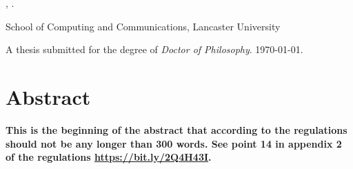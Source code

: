 \begin{center}
\textbf{\thesistitle}

\authorname, \authordegrees.

School of Computing and Communications, Lancaster University

A thesis submitted for the degree of \textit{Doctor of Philosophy}. \monthyeardate\today.
\end{center}

\section*{\centering Abstract}

\textbf{This is the beginning of the abstract that according to the regulations should not be any longer than 300 words. See point 14 in appendix 2 of the regulations \url{https://bit.ly/2Q4H43I}.}
